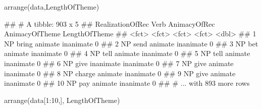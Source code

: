 \documentclass[
]{book}
\newenvironment{Shaded}{\begin{snugshade}}{\end{snugshade}}
\newcommand{\DecValTok}[1]{\textcolor[rgb]{0.00,0.00,0.81}{#1}}
\newcommand{\FunctionTok}[1]{\textcolor[rgb]{0.00,0.00,0.00}{#1}}
\newcommand{\NormalTok}[1]{#1}
\newcommand{\SpecialCharTok}[1]{\textcolor[rgb]{0.00,0.00,0.00}{#1}}
\begin{document}
\begin{Shaded}
\begin{Highlighting}[]
\FunctionTok{arrange}\NormalTok{(data,LengthOfTheme)}
\end{Highlighting}
\end{Shaded}

\begin{Shaded}
\begin{Highlighting}[]
\NormalTok{\#\# \# A tibble: 903 x 5}
\NormalTok{\#\#    RealizationOfRec Verb   AnimacyOfRec AnimacyOfTheme LengthOfTheme}
\NormalTok{\#\#    \textless{}fct\textgreater{}            \textless{}fct\textgreater{}  \textless{}fct\textgreater{}        \textless{}fct\textgreater{}                  \textless{}dbl\textgreater{}}
\NormalTok{\#\#  1 NP               bring  animate      inanimate                  0}
\NormalTok{\#\#  2 NP               send   animate      inanimate                  0}
\NormalTok{\#\#  3 NP               bet    animate      inanimate                  0}
\NormalTok{\#\#  4 NP               tell   animate      inanimate                  0}
\NormalTok{\#\#  5 NP               tell   animate      inanimate                  0}
\NormalTok{\#\#  6 NP               give   inanimate    inanimate                  0}
\NormalTok{\#\#  7 NP               give   animate      inanimate                  0}
\NormalTok{\#\#  8 NP               charge animate      inanimate                  0}
\NormalTok{\#\#  9 NP               give   animate      inanimate                  0}
\NormalTok{\#\# 10 NP               pay    animate      inanimate                  0}
\NormalTok{\#\# \# ... with 893 more rows}
\end{Highlighting}
\end{Shaded}

\begin{Shaded}
\begin{Highlighting}[]
\FunctionTok{arrange}\NormalTok{(data[}\DecValTok{1}\SpecialCharTok{:}\DecValTok{10}\NormalTok{,], LengthOfTheme)}
\end{Highlighting}
\end{Shaded}
\end{document}
